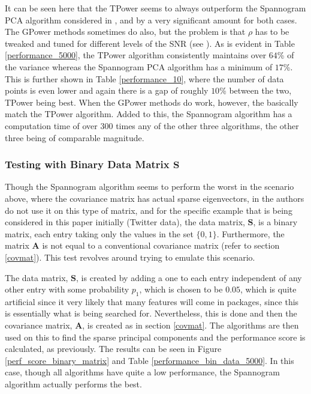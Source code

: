 \documentclass[11pt,a4paper]{article}
\newcommand{\smat}{\mathbf{S}}
\newcommand{\covmat}{\mathbf{A}}
\begin{document}
It can be seen here that the TPower seems to always outperform the Spannogram PCA algorithm considered in \cite{dimakis}, and by a very significant amount for both cases. The GPower methods sometimes do also, but the problem is that $\rho$ has to be tweaked and tuned for different levels of the SNR (see \cite{GPower}). As is evident in Table \ref{performance_5000}, the TPower algorithm consistently maintains over $64$\% of the variance whereas the Spannogram PCA algorithm has a minimum of $17$\%. This is further shown in Table \ref{performance_10}, where the number of data points is even lower and again there is a gap of roughly $10$\% between the two, TPower being best. When the GPower methods do work, however, the basically match the TPower algorithm. Added to this, the Spannogram algorithm has a computation time of over 300 times any of the other three algorithms, the other three being of comparable magnitude.

\subsubsection{Testing with Binary Data Matrix $\smat$}

Though the Spannogram algorithm seems to perform the worst in the scenario above, where the covariance matrix has actual sparse eigenvectors, in \cite{dimakis} the authors do not use it on this type of matrix, and for the specific example that is being considered in this paper initially (Twitter data), the data matrix, $\smat$, is a binary matrix, each entry taking only the values in the set $\{ 0, 1\}$. Furthermore, the matrix $\covmat$ is not equal to a conventional covariance matrix (refer to section \ref{covmat}). This test revolves around trying to emulate this scenario. 

The data matrix, $\smat$, is created by adding a one to each entry independent of any other entry with some probability $p_\text{1}$, which is chosen to be $0.05$, which is quite artificial since it very likely that many features will come in packages, since this is essentially what is being searched for. Nevertheless, this is done and then the covariance matrix, $\covmat$, is created as in section \ref{covmat}. The algorithms are then used on this to find the sparse principal components and the performance score is calculated, as previously. The results can be seen in Figure \ref{perf_score_binary_matrix} and Table \ref{performance_bin_data_5000}. In this case, though all algorithms have quite a low performance, the Spannogram algorithm actually performs the best. 
\end{document}
